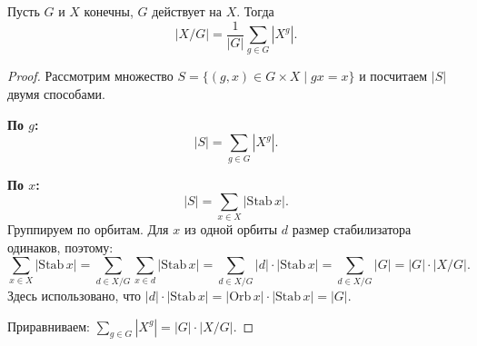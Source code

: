 \begin{theorem}
    Пусть $G$ и $X$ конечны, $G$ действует на $X$. Тогда
    \[
        |X / G| = \frac{1}{|G|} \sum_{g \in G} |X^g|.
    \]

    \begin{proof}
        Рассмотрим множество $S = \{(g, x) \in G \times X \mid gx = x\}$ и посчитаем $|S|$ двумя способами.

        \textbf{По $g$:}
        \[
            |S| = \sum_{g \in G} |X^g|.
        \]

        \textbf{По $x$:}
        \[
            |S| = \sum_{x \in X} |\mathrm{Stab}\, x|.
        \]
        Группируем по орбитам. Для $x$ из одной орбиты $d$ размер стабилизатора одинаков, поэтому:
        \[
            \sum_{x \in X} |\mathrm{Stab}\, x| = \sum_{d \in X/G} \sum_{x \in d} |\mathrm{Stab}\, x| = \sum_{d \in X/G} |d| \cdot |\mathrm{Stab}\, x| = \sum_{d \in X/G} |G| = |G| \cdot |X/G|.
        \]
        Здесь использовано, что $|d| \cdot |\mathrm{Stab}\, x| = |\mathrm{Orb}\, x| \cdot |\mathrm{Stab}\, x| = |G|$.

        Приравниваем: $\sum_{g \in G} |X^g| = |G| \cdot |X/G|$.
    \end{proof}
\end{theorem}



